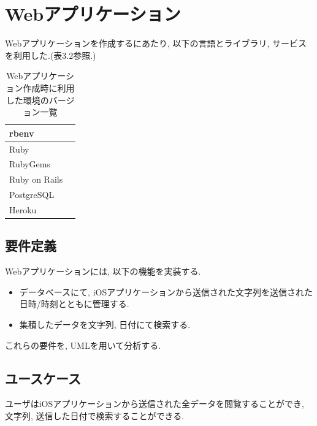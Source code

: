 \section{Webアプリケーション}
Webアプリケーションを作成するにあたり, 以下の言語とライブラリ, サービスを利用した.(表3.2参照.)

\begin{table}
\begin{center}
\begin{tabular}{|l|l|} \hline
rbenv & \\ \hline
Ruby & \\ \hline
RubyGems & \\ \hline
Ruby on Rails & \\ \hline
PostgreSQL & \\ \hline
Heroku & \\ \hline
\end{tabular}
\end{center}
\caption{Webアプリケーション作成時に利用した環境のバージョン一覧}
\end{table}

\subsection{要件定義}
Webアプリケーションには, 以下の機能を実装する.

\begin{itemize}
\item データベースにて, iOSアプリケーションから送信された文字列を送信された日時/時刻とともに管理する.

\item 集積したデータを文字列, 日付にて検索する.
\end{itemize}

これらの要件を, UMLを用いて分析する.

\subsection{ユースケース}
ユーザはiOSアプリケーションから送信された全データを閲覧することができ, 文字列, 送信した日付で検索することができる.

